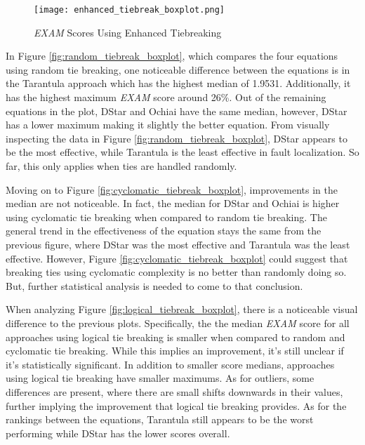 \begin{figure}[!htb]
	\begin{center}
		\texttt{[image: enhanced\_tiebreak\_boxplot.png]}
		\caption{\label{fig:enhanced_tiebreak_boxplot} \emph{EXAM} Scores Using
		Enhanced Tiebreaking}
	\end{center}
\end{figure}

In Figure \ref{fig:random_tiebreak_boxplot}, which compares the four
equations using random tie breaking, one noticeable difference between the
equations is in the Tarantula approach which has the highest median of 1.9531.
Additionally, it has the highest maximum \emph{EXAM} score around 26\%.
Out of the remaining equations in the plot, DStar and Ochiai have the same
median, however, DStar has a lower maximum making it slightly the better
equation. From visually inspecting the data in Figure
\ref{fig:random_tiebreak_boxplot}, DStar appears to be the most effective, while
Tarantula is the least effective in fault localization. So far, this only
applies when ties are handled randomly.

Moving on to Figure \ref{fig:cyclomatic_tiebreak_boxplot}, improvements in the
median are not noticeable. In fact, the median for DStar and Ochiai is higher
using cyclomatic tie breaking when compared to random tie breaking. The general
trend in the effectiveness of the equation stays the same from the previous
figure, where DStar was the most effective and Tarantula was the least
effective. However, Figure \ref{fig:cyclomatic_tiebreak_boxplot} could suggest
that breaking ties using cyclomatic complexity is no better than randomly doing
so. But, further statistical analysis is needed to come to that conclusion.

When analyzing Figure \ref{fig:logical_tiebreak_boxplot}, there is a noticeable
visual difference to the previous plots. Specifically, the the median
\emph{EXAM} score for all approaches using logical tie breaking is smaller when
compared to random and cyclomatic tie breaking. While this implies an
improvement, it's still unclear if it's statistically significant. In addition
to smaller score medians, approaches using logical tie breaking have smaller
maximums. As for outliers, some differences are present, where there are small
shifts downwards in their values, further implying the improvement that logical
tie breaking provides. As for the rankings between the equations, Tarantula
still appears to be the worst performing while DStar has the lower scores
overall.

